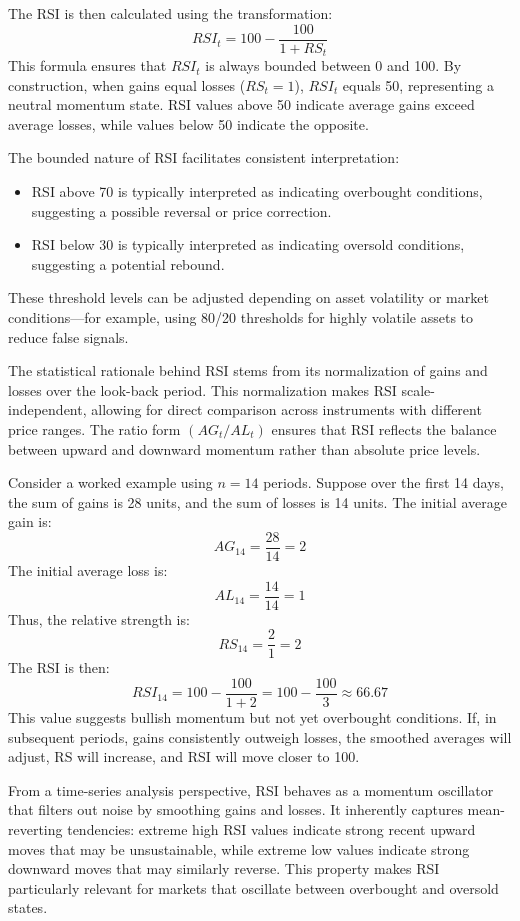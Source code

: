 The RSI is then calculated using the transformation:
\[
RSI_t = 100 - \frac{100}{1 + RS_t}
\]
This formula ensures that $RSI_t$ is always bounded between 0 and 100. By construction, when gains equal losses ($RS_t = 1$), $RSI_t$ equals 50, representing a neutral momentum state. RSI values above 50 indicate average gains exceed average losses, while values below 50 indicate the opposite.

The bounded nature of RSI facilitates consistent interpretation:
\begin{itemize}
    \item RSI above 70 is typically interpreted as indicating overbought conditions, suggesting a possible reversal or price correction.
    \item RSI below 30 is typically interpreted as indicating oversold conditions, suggesting a potential rebound.
\end{itemize}
These threshold levels can be adjusted depending on asset volatility or market conditions—for example, using 80/20 thresholds for highly volatile assets to reduce false signals.

The statistical rationale behind RSI stems from its normalization of gains and losses over the look-back period. This normalization makes RSI scale-independent, allowing for direct comparison across instruments with different price ranges. The ratio form $(AG_t / AL_t)$ ensures that RSI reflects the balance between upward and downward momentum rather than absolute price levels.

Consider a worked example using $n=14$ periods. Suppose over the first 14 days, the sum of gains is 28 units, and the sum of losses is 14 units. The initial average gain is:
\[
AG_{14} = \frac{28}{14} = 2
\]
The initial average loss is:
\[
AL_{14} = \frac{14}{14} = 1
\]
Thus, the relative strength is:
\[
RS_{14} = \frac{2}{1} = 2
\]
The RSI is then:
\[
RSI_{14} = 100 - \frac{100}{1 + 2} = 100 - \frac{100}{3} \approx 66.67
\]
This value suggests bullish momentum but not yet overbought conditions. If, in subsequent periods, gains consistently outweigh losses, the smoothed averages will adjust, RS will increase, and RSI will move closer to 100.

From a time-series analysis perspective, RSI behaves as a momentum oscillator that filters out noise by smoothing gains and losses. It inherently captures mean-reverting tendencies: extreme high RSI values indicate strong recent upward moves that may be unsustainable, while extreme low values indicate strong downward moves that may similarly reverse. This property makes RSI particularly relevant for markets that oscillate between overbought and oversold states.

